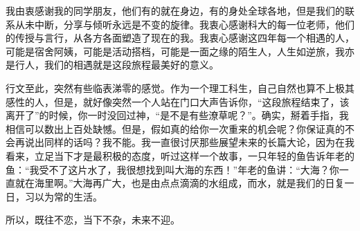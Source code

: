 \begin{acknowledgements}
    我由衷感谢我的同学朋友，他们有的就在身边，有的身处全球各地，但是我们的联系从未中断，分享与倾听永远是不变的旋律。我衷心感谢科大的每一位老师，他们的传授与言行，从各方各面塑造了现在的我。我衷心感谢这四年每一个相遇的人，可能是宿舍阿姨，可能是活动搭档，可能是一面之缘的陌生人，人生如逆旅，我亦是行人，我们的相遇就是这段旅程最美好的意义。

    行文至此，突然有些临表涕零的感觉。作为一个理工科生，自己自然也算不上极其感性的人，但是，就好像突然一个人站在门口大声告诉你，“这段旅程结束了，该离开了”的时候，你一时没回过神，“是不是有些潦草呢？”。确实，掰着手指，我相信可以数出上百处缺憾。但是，假如真的给你一次重来的机会呢？你保证真的不会再说出同样的话吗？我不能。我一直很讨厌那些展望未来的长篇大论，因为在我看来，立足当下才是最积极的态度，听过这样一个故事，一只年轻的鱼告诉年老的鱼：“我受不了这片水了，我很想找到叫大海的东西！”年老的鱼讲：“大海？你一直就在海里啊。”大海再广大，也是由点点滴滴的水组成，而水，就是我们的日复一日，习以为常的生活。
    
    所以，既往不恋，当下不杂，未来不迎。
\end{acknowledgements}
